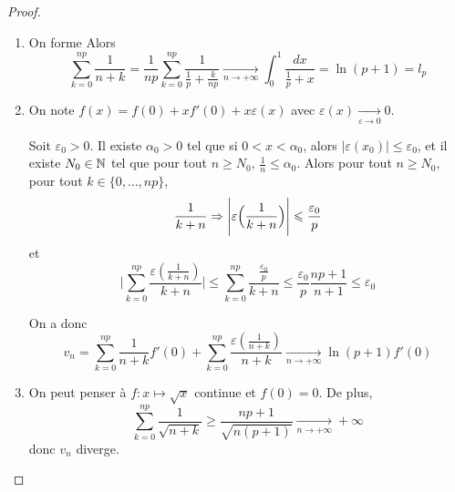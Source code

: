 \begin{proof}
	\phantom{}
	\begin{enumerate}
		\item On forme 
		Alors 
		\begin{equation}\sum_{k=0}^{np}\frac{1}{n+k}=\frac{1}{np}\sum_{k=0}^{np}\frac{1}{\frac{1}{p}+\frac{k}{np}}\xrightarrow[n\to+\infty]{}\int_{0}^{1}\frac{dx}{\frac{1}{p}+x}=\ln(p+1)=l_{p}\end{equation}

		\item On note $f(x)=f(0)+xf'(0)+x\varepsilon(x)$ avec $\varepsilon(x)\xrightarrow[\varepsilon\to0]{}0$. 
		
		Soit $\varepsilon_{0}>0$. Il existe $\alpha_{0}>0$ tel que si $0<x<\alpha_{0}$, alors $\vert\varepsilon(x_{0})\vert\leqslant\varepsilon_{0}$, et il existe $N_{0}\in\mathbb{N}$ tel que pour tout $n\geqslant N_{0}$, $\frac{1}{n}\leqslant\alpha_{0}$. Alors pour tout $n\geqslant N_{0}$, pour tout $k\in\{0,\dots,np\}$, 
		\begin{equation}\frac{1}{k+n}\Rightarrow \Biggl\vert\varepsilon\Bigl(\frac{1}{k+n}\Bigr)\Biggr\vert\leqslant\frac{\varepsilon_{0}}{p}\end{equation}
		et
		\begin{equation}\Biggl\vert\sum_{k=0}^{np}\frac{\varepsilon(\frac{1}{k+n})}{k+n}\Biggr\vert\leqslant\sum_{k=0}^{np}\frac{\frac{\varepsilon_{0}}{p}}{k+n}\leqslant\frac{\varepsilon_{0}}{p}\frac{np+1}{n+1}\leqslant\varepsilon_{0}\end{equation}

		On a donc
		\begin{equation}v_{n}=\sum_{k=0}^{np}\frac{1}{n+k}f'(0)+\sum_{k=0}^{np}\frac{\varepsilon(\frac{1}{n+k})}{n+k}\xrightarrow[n\to+\infty]{}\ln(p+1)f'(0)\end{equation}

		\item On peut penser à $f\colon x\mapsto\sqrt{x}$ continue et $f(0)=0$. De plus,
		\begin{equation}\sum_{k=0}^{np}\frac{1}{\sqrt{n+k}}\geqslant\frac{np+1}{\sqrt{n(p+1)}}\xrightarrow[n\to+\infty]{}+\infty\end{equation}
		donc $v_{n}$ diverge.


\end{enumerate}
\end{proof}
